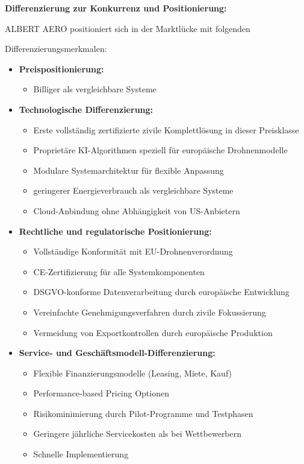 \documentclass[11pt,a4paper]{article}
\begin{document}
\textbf{Differenzierung zur Konkurrenz und Positionierung:}


ALBERT AERO positioniert sich in der Marktlücke mit folgenden

Differenzierungsmerkmalen:

\newpage

\begin{itemize}
\item \textbf{Preispositionierung:}
\begin{itemize}
\item Billiger als vergleichbare Systeme
\end{itemize}

\item \textbf{Technologische Differenzierung:}
\begin{itemize}
\item Erste vollständig zertifizierte zivile Komplettlösung in dieser Preisklasse
\item Proprietäre KI-Algorithmen speziell für europäische Drohnenmodelle
\item Modulare Systemarchitektur für flexible Anpassung
\item geringerer Energieverbrauch als vergleichbare Systeme
\item Cloud-Anbindung ohne Abhängigkeit von US-Anbietern
\end{itemize}

\item \textbf{Rechtliche und regulatorische Positionierung:}
\begin{itemize}
\item Vollständige Konformität mit EU-Drohnenverordnung
\item CE-Zertifizierung für alle Systemkomponenten
\item DSGVO-konforme Datenverarbeitung durch europäische Entwicklung
\item Vereinfachte Genehmigungsverfahren durch zivile Fokussierung
\item Vermeidung von Exportkontrollen durch europäische Produktion
\end{itemize}

\item \textbf{Service- und Geschäftsmodell-Differenzierung:}
\begin{itemize}
\item Flexible Finanzierungsmodelle (Leasing, Miete, Kauf)
\item Performance-based Pricing Optionen
\item Risikominimierung durch Pilot-Programme und Testphasen
\item Geringere jährliche Servicekosten als bei Wettbewerbern
\item Schnelle Implementierung
\end{itemize}


\end{itemize}
\end{document}
